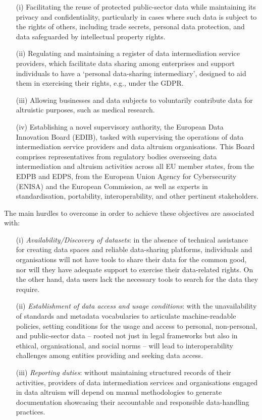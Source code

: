 \begin{enumerate}
    \item[(i)] Facilitating the reuse of protected public-sector data while maintaining its privacy and confidentiality, particularly in cases where such data is subject to the rights of others, including trade secrets, personal data protection, and data safeguarded by intellectual property rights.
    \item[(ii)] Regulating and maintaining a register of data intermediation service providers, which facilitate data sharing among enterprises and support individuals to have a `personal data-sharing intermediary', designed to aid them in exercising their rights, e.g., under the GDPR.
    \item[(iii)] Allowing businesses and data subjects to voluntarily contribute data for altruistic purposes, such as medical research.
    \item[(iv)] Establishing a novel supervisory authority, the European Data Innovation Board (EDIB), tasked with supervising the operations of data intermediation service providers and data altruism organisations.
    This Board comprises representatives from regulatory bodies overseeing data intermediation and altruism activities across all EU member states, from the EDPB and EDPS, from the European Union Agency for Cybersecurity (ENISA) and the European Commission, as well as experts in standardisation, portability, interoperability, and other pertinent stakeholders.
\end{enumerate}

The main hurdles to overcome in order to achieve these objectives are associated with:

\begin{enumerate}
    \item[(i)] \textit{Availability/Discovery of datasets}: in the absence of technical assistance for creating data spaces and reliable data-sharing platforms, individuals and organisations will not have tools to share their data for the common good, nor will they have adequate support to exercise their data-related rights. On the other hand, data users lack the necessary tools to search for the data they require.
    \item[(ii)] \textit{Establishment of data access and usage conditions}: with the unavailability of standards and metadata vocabularies to articulate machine-readable policies, setting conditions for the usage and access to personal, non-personal, and public-sector data -- rooted not just in legal frameworks but also in ethical, organisational, and social norms -- will lead to interoperability challenges among entities providing and seeking data access.
    \item[(iii)] \textit{Reporting duties}: without maintaining structured records of their activities, providers of data intermediation services and organisations engaged in data altruism will depend on manual methodologies to generate documentation showcasing their accountable and responsible data-handling practices.
\end{enumerate}

